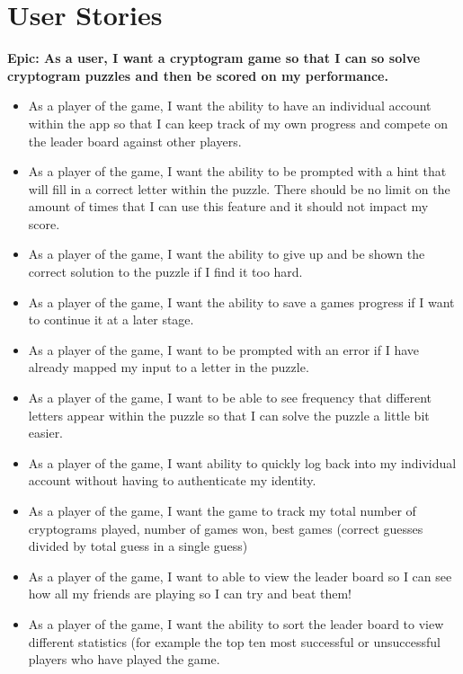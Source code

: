 \documentclass[a4paper,12pt]{article}
\begin{document}
\section{User Stories}


\textbf{Epic: As a user, I want a cryptogram game so that I can so solve cryptogram puzzles and then be scored on my performance.}


\begin{itemize}

  \item As a player of the game, I want the ability to have an individual account within the app so that I can keep track of my own progress and compete on the leader board against other players.

  \item As a player of the game, I want the ability to be prompted with a hint that will fill in a correct letter within the puzzle. There should be no limit on the amount of times that I can use this feature and it should not impact my score.

  \item As a player of the game, I want the ability to give up and be shown the correct solution to the puzzle if I find it too hard. 

  \item As a player of the game, I want the ability to save a games progress if I want to continue it at a later stage. 

  \item As a player of the game, I want to be prompted with an error if I have already mapped my input to a letter in the puzzle.

  \item As a player of the game, I want to be able to see frequency that different letters appear within the puzzle so that I can solve the puzzle a little bit easier. 

  \item As a player of the game, I want ability to quickly log back into my individual account without having to authenticate my identity. 

  \item As a player of the game, I want the game to track my total number of cryptograms played, number of games won, best games (correct guesses divided by total guess in a single guess)

  \item As a player of the game, I want to able to view the leader board so I can see how all my friends are playing so I can try and beat them!

  \item As a player of the game, I want the ability to sort the leader board to view different statistics (for example the top ten most successful or unsuccessful players who have played the game. 

\end{itemize}
\end{document}
